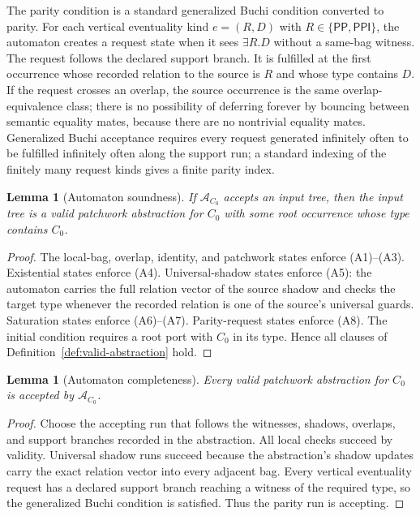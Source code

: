 \documentclass[11pt]{article}
\newtheorem{lemma}[theorem]{Lemma}
\newcommand{\PP}{\mathsf{PP}}
\newcommand{\PPI}{\mathsf{PPI}}
\newcommand{\APTA}{\mathcal A}
\begin{document}
The parity condition is a standard generalized Buchi condition converted to parity.  For
each vertical eventuality kind $e=(R,D)$ with $R\in\{\PP,\PPI\}$, the automaton creates a
request state when it sees $\exists R.D$ without a same-bag witness.  The request follows
the declared support branch.  It is fulfilled at the first occurrence whose recorded
relation to the source is $R$ and whose type contains $D$.  If the request crosses an
overlap, the source occurrence is the same overlap-equivalence class; there is no
possibility of deferring forever by bouncing between semantic equality mates, because
there are no nontrivial equality mates.  Generalized Buchi acceptance requires every
request generated infinitely often to be fulfilled infinitely often along the support
run; a standard indexing of the finitely many request kinds gives a finite parity index.

\begin{lemma}[Automaton soundness]\label{lem:auto-sound}
If $\APTA_{C_0}$ accepts an input tree, then the input tree is a valid patchwork
abstraction for $C_0$ with some root occurrence whose type contains $C_0$.
\end{lemma}

\begin{proof}
The local-bag, overlap, identity, and patchwork states enforce (A1)--(A3).  Existential
states enforce (A4).  Universal-shadow states enforce (A5): the automaton carries the
full relation vector of the source shadow and checks the target type whenever the recorded
relation is one of the source's universal guards.  Saturation states enforce (A6)--(A7).
Parity-request states enforce (A8).  The initial condition requires a root port with
$C_0$ in its type.  Hence all clauses of Definition~\ref{def:valid-abstraction} hold.
\end{proof}

\begin{lemma}[Automaton completeness]\label{lem:auto-complete}
Every valid patchwork abstraction for $C_0$ is accepted by $\APTA_{C_0}$.
\end{lemma}

\begin{proof}
Choose the accepting run that follows the witnesses, shadows, overlaps, and support
branches recorded in the abstraction.  All local checks succeed by validity.  Universal
shadow runs succeed because the abstraction's shadow updates carry the exact relation
vector into every adjacent bag.  Every vertical eventuality request has a declared support
branch reaching a witness of the required type, so the generalized Buchi condition is
satisfied.  Thus the parity run is accepting.
\end{proof}
\end{document}
